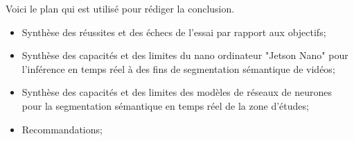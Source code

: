 ﻿{\color{red}
\par Voici le plan qui est utilisé pour rédiger la conclusion.
\begin{itemize}
   \item Synthèse des réussites et des échecs de l'essai par rapport aux objectifs;
   \item Synthèse des capacités et des limites du nano ordinateur "Jetson Nano" pour l'inférence en temps réel à des fins de segmentation sémantique de vidéos;
   \item Synthèse des capacités et des limites des modèles de réseaux de neurones pour la segmentation sémantique en temps réel de la zone d’études;
   \item Recommandations;
\end{itemize}
}